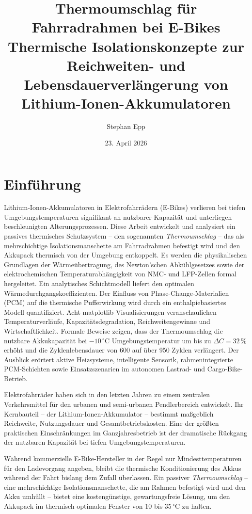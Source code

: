 ﻿\documentclass[a4paper,12pt]{article}
\title{\textbf{Thermoumschlag f\"ur \\ Fahrradrahmen bei E-Bikes}\\[0.4em]
\large Thermische Isolationskonzepte zur Reichweiten- und Lebensdauerverl\"angerung von Lithium-Ionen-Akkumulatoren}
\author{Stephan Epp}
\date{23. April 2026}
\theoremstyle{definition}
\begin{document}
\maketitle
\tableofcontents
\newpage


\section{Einf\"uhrung}
Lithium-Ionen-Akkumulatoren in Elektrofahrr\"adern (E-Bikes) verlieren bei tiefen Umgebungstemperaturen signifikant an nutzbarer Kapazit\"at und unterliegen beschleunigten Alterungsprozessen. Diese Arbeit entwickelt und analysiert ein passives thermisches Schutzsystem -- den sogenannten \emph{Thermoumschlag} -- das als mehrschichtige Isolationsmanschette am Fahrradrahmen befestigt wird und den Akkupack thermisch von der Umgebung entkoppelt. Es werden die physikalischen Grundlagen der W\"arme\"ubertragung, des Newton'schen Abk\"uhlgesetzes sowie der elektrochemischen Temperaturabh\"angigkeit von NMC- und LFP-Zellen formal hergeleitet. Ein analytisches Schichtmodell liefert den optimalen W\"armedurchgangskoeffizienten. Der Einfluss von Phase-Change-Materialien (PCM) auf die thermische Pufferwirkung wird durch ein enthalpiebasiertes Modell quantifiziert. Acht matplotlib-Visualisierungen veranschaulichen Temperaturverl\"aufe, Kapazit\"atsdegradation, Reichweitengewinne und Wirtschaftlichkeit. Formale Beweise zeigen, dass der Thermoumschlag die nutzbare Akkukapazit\"at bei $-10\,{}^\circ\mathrm{C}$ Umgebungstemperatur um bis zu $\Delta C = 32\,\%$ erh\"oht und die Zyklenlebensdauer von 600 auf \"uber 950 Zyklen verl\"angert. Der Ausblick er\"ortert aktive Heizsysteme, intelligente Sensorik, rahmenintegrierte PCM-Schichten sowie Einsatzszenarien im autonomen Last\-rad- und Cargo-Bike-Betrieb.

Elektrofahrr\"ader haben sich in den letzten Jahren zu einem zentralen Verkehrsmittel f\"ur den urbanen und semi-urbanen Pendlerbereich entwickelt. Ihr Kernbauteil -- der Lithium-Ionen-Akkumulator -- bestimmt ma\ss{}geblich Reichweite, Nutzungsdauer und Gesamtbetriebskosten. Eine der gr\"o\ss{}ten praktischen Einschr\"ankungen im Ganzjahresbetrieb ist der dramatische R\"uckgang der nutzbaren Kapazit\"at bei tiefen Umgebungstemperaturen.

W\"ahrend kommerzielle E-Bike-Hersteller in der Regel nur Mindesttemperaturen f\"ur den Ladevorgang angeben, bleibt die thermische Konditionierung des Akkus w\"ahrend der Fahrt bislang dem Zufall \"uberlassen. Ein passiver \emph{Thermoumschlag} -- eine mehrschichtige Isolationsmanschette, die am Rahmen befestigt wird und den Akku umh\"ullt -- bietet eine kosteng\"unstige, gewartungsfreie L\"osung, um den Akkupack im thermisch optimalen Fenster von $10$ bis $35\,{}^\circ\mathrm{C}$ zu halten.
\end{document}
